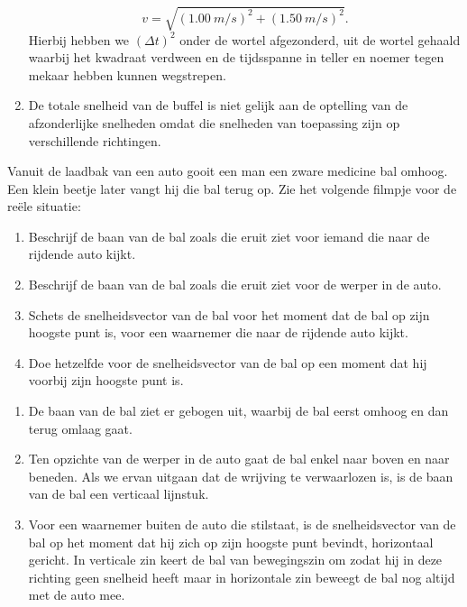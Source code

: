 \documentclass{ximera}
\begin{document}
\begin{denkvraag*}{}
\begin{oplossing}
\begin{enumerate}
        \begin{equation*}
            v=\sqrt{(\SI{1,00}{m/s})^2+(\SI{1,50}{m/s})^2}.
        \end{equation*}
        Hierbij hebben we $(\Delta t)^2$ onder de wortel afgezonderd, uit de wortel gehaald waarbij het kwadraat verdween en de tijdsspanne in teller en noemer tegen mekaar hebben kunnen wegstrepen.
        \item De totale snelheid van de buffel is niet gelijk aan de optelling van de afzonderlijke snelheden omdat die snelheden van toepassing zijn op verschillende richtingen.
    \end{enumerate}
\end{oplossing}
\end{denkvraag*} \nl

\begin{denkvraag*}{}
	Vanuit de laadbak van een auto gooit een man een zware medicine bal omhoog. Een klein beetje later vangt hij die bal terug op. Zie het volgende filmpje voor de reële situatie:
	\begin{center}
	\end{center}
\begin{enumerate}
    \item Beschrijf de baan van de bal zoals die eruit ziet voor iemand die naar de rijdende auto kijkt.
    \item Beschrijf de baan van de bal zoals die eruit ziet voor de werper in de auto.
    \item Schets de snelheidsvector van de bal voor het moment dat de bal op zijn hoogste punt is, voor een waarnemer die naar de rijdende auto kijkt.
    \item Doe hetzelfde voor de snelheidsvector van de bal op een moment dat hij voorbij zijn hoogste punt is.
\end{enumerate}
\begin{oplossing}
    \begin{enumerate}
        \item De baan van de bal ziet er gebogen uit, waarbij de bal eerst omhoog en dan terug omlaag gaat.
        \item Ten opzichte van de werper in de auto gaat de bal enkel naar boven en naar beneden. Als we ervan uitgaan dat de wrijving te verwaarlozen is, is de baan van de bal een verticaal lijnstuk.
        \item Voor een waarnemer buiten de auto die stilstaat, is de snelheidsvector van de bal op het moment dat hij zich op zijn hoogste punt bevindt, horizontaal gericht. In verticale zin keert de bal van bewegingszin om zodat hij in deze richting geen snelheid heeft maar in horizontale zin beweegt de bal nog altijd met de auto mee.

\end{enumerate}
\end{oplossing}
\end{denkvraag*}
\end{document}
